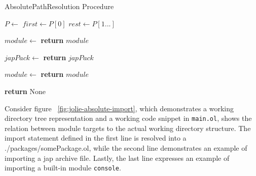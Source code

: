 \begin{algorithm}[h]
    \caption{AbsolutePathResolution Procedure}
    \label{algo:absolutePath}
    \begin{algorithmic}[1]


        \State $P\gets$  
        \State $first\gets P[0]$ 
        \State $rest\gets P[1...]$ 

        \State $module \gets$
        \State \textbf{return} $module$ 
        \EndIf

        \State $japPack \gets$
        \State \textbf{return} $japPack$
        \EndIf
        \EndIf

        \State $module \gets$
        \State \textbf{return} $module$ 
        \EndIf
        \EndFor

        \State \textbf{return} None 

        \EndProcedure

    \end{algorithmic}
\end{algorithm}

Consider figure ~\ref{fig:jolie-absolute-import}, which demonstrates a working directory tree representation and a working code snippet in \texttt{main.ol}, shows the relation between module targets to the actual working directory structure. The import statement defined in the first line is resolved into a ./packages/somePackage.ol, while the second line demonstrates an example of importing a jap archive file. Lastly, the last line expresses an example of importing a built-in module \texttt{console}.

